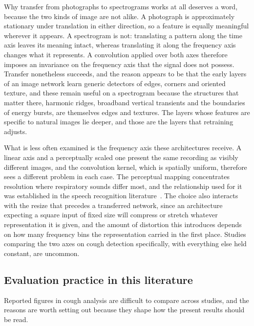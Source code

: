 \documentclass[pdflatex,sn-mathphys-num]{sn-jnl}
\begin{document}
Why transfer from photographs to spectrograms works at all deserves a word,
because the two kinds of image are not alike. A photograph is approximately
stationary under translation in either direction, so a feature is equally
meaningful wherever it appears. A spectrogram is not: translating a pattern
along the time axis leaves its meaning intact, whereas translating it along
the frequency axis changes what it represents. A convolution applied over both
axes therefore imposes an invariance on the frequency axis that the signal
does not possess. Transfer nonetheless succeeds, and the reason appears to be
that the early layers of an image network learn generic detectors of edges,
corners and oriented texture, and these remain useful on a spectrogram because
the structures that matter there, harmonic ridges, broadband vertical
transients and the boundaries of energy bursts, are themselves edges and
textures. The layers whose features are specific to natural images lie deeper,
and those are the layers that retraining adjusts.

What is less often examined is the frequency axis these architectures receive.
A linear axis and a perceptually scaled one present the same recording as
visibly different images, and the convolution kernel, which is spatially
uniform, therefore sees a different problem in each case. The perceptual
mapping concentrates resolution where respiratory sounds differ most, and the
relationship used for it was established in the speech recognition
literature~\cite{davis1980}. The choice also interacts with the resize that
precedes a transferred network, since an architecture expecting a square
input of fixed size will compress or stretch whatever representation it is
given, and the amount of distortion this introduces depends on how many
frequency bins the representation carried in the first place. Studies
comparing the two axes on cough detection specifically, with everything else
held constant, are uncommon.

\subsection{Evaluation practice in this literature}\label{sec:rel-eval}

Reported figures in cough analysis are difficult to compare across studies,
and the reasons are worth setting out because they shape how the present
results should be read.
\end{document}
